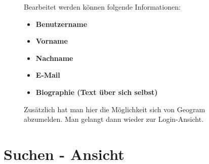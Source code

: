 \begin{figure}[H]
\begin{minipage}{.6\textwidth}
\begin{changemargin}{0.5cm}{0cm}
            Bearbeitet werden können folgende Informationen:
            \begin{itemize}
                \item \textbf{Benutzername}
                \item \textbf{Vorname}
                \item \textbf{Nachname}
                \item \textbf{E-Mail}
                \item \textbf{Biographie (Text über sich selbst)}
            \end{itemize}

            Zusätzlich hat man hier die Möglichkeit sich von Geogram abzumelden. Man gelangt dann wieder zur Login-Ansicht.
        \end{changemargin}
    \end{minipage}
\end{figure}

\section{Suchen - Ansicht\label{sec4.3:Unterpunkt-3}}

